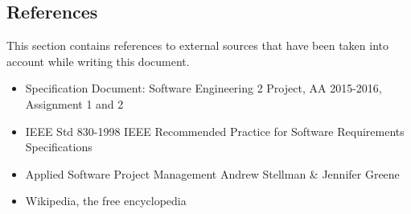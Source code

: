 \subsection{References}
This section contains references to external sources that have been taken into account while writing this document.
\begin{itemize}
	\item Specification Document: Software Engineering 2 Project, AA 2015-2016, Assignment 1 and 2
	\item IEEE Std 830-1998 IEEE Recommended Practice for Software Requirements Specifications
	\item Applied Software Project Management Andrew Stellman \& Jennifer Greene
	\item Wikipedia, the free encyclopedia
\end{itemize}